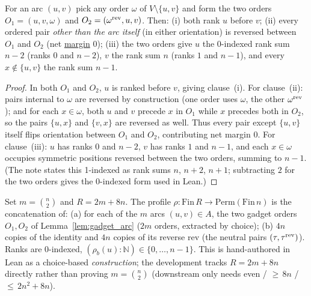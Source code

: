 \begin{lemma}
\label{lem:gadget_arc}
\leanok
{}
For an arc $(u,v)$ pick any order $\omega$ of $V \setminus \{u,v\}$ and form the
two orders $O_1 = (u,v,\omega)$ and $O_2 = (\omega^{\operatorname{rev}}, u, v)$. Then: (i) both
rank $u$ before $v$; (ii) every ordered pair \emph{other than the arc itself} (in
either orientation) is reversed between $O_1$ and $O_2$ (net
\href{https://github.com/chinmayhegde/lea-frontier/blob/93d37a15db4cbca0a10870f977b5f223cf04c91f/LeaFrontier/OrderingRecovery/ProfileMargins.lean#L336}{margin}
$0$); (iii)
the two orders give $u$ the 0-indexed rank sum $n-2$ (ranks $0$ and $n-2$), $v$
the rank sum $n$ (ranks $1$ and $n-1$), and every $x \notin \{u,v\}$ the rank sum
$n-1$.
\end{lemma}
\begin{proof}
\leanok
{}
In both $O_1$ and $O_2$, $u$ is ranked before $v$, giving clause~(i). For
clause~(ii): pairs internal to $\omega$ are reversed by construction (one order
uses $\omega$, the other $\omega^{\operatorname{rev}}$); and for each $x \in \omega$, both $u$
and $v$ precede $x$ in $O_1$ while $x$ precedes both in $O_2$, so the pairs
$\{u,x\}$ and $\{v,x\}$ are reversed as well. Thus every pair except $\{u,v\}$
itself flips orientation between $O_1$ and $O_2$, contributing net margin $0$.
For clause~(iii): $u$ has ranks $0$ and $n-2$, $v$ has ranks $1$ and $n-1$, and
each $x \in \omega$ occupies symmetric positions reversed between the two orders,
summing to $n-1$. (The note states this 1-indexed as rank sums $n$, $n+2$,
$n+1$; subtracting $2$ for the two orders gives the 0-indexed form used in Lean.)
\end{proof}

\begin{definition}
\label{def:profile}
\leanok
{}
Set $m = \binom n2$ and $R = 2m + 8n$. The profile
$\rho : \mathrm{Fin}\,R \to \mathrm{Perm}(\mathrm{Fin}\,n)$ is the concatenation
of: (a) for each of the $m$ arcs $(u,v) \in A$, the two gadget orders $O_1, O_2$
of Lemma~\ref{lem:gadget_arc} ($2m$ orders, extracted by choice); (b) $4n$ copies
of the identity and $4n$ copies of its reverse $\mathrm{rev}$ (the neutral pairs
$(\tau, \tau^{\operatorname{rev}})$). Ranks are 0-indexed,
$(\rho_b(u) : \mathbb{N}) \in \{0,\dots,n-1\}$. This is hand-authored in Lean as a
choice-based \emph{construction}; the development tracks $R = 2m + 8n$ directly
rather than proving $m = \binom n2$ (downstream only needs even / ${\ge}\,8n$ /
${\le}\,2n^2+8n$).
\end{definition}

